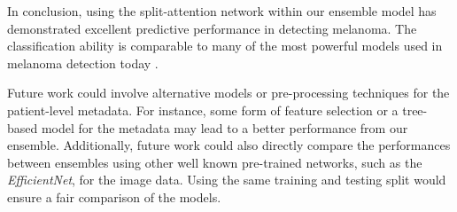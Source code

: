 \documentclass [MAS] {uclathes}
\begin{document}
In conclusion, using the split-attention network within our ensemble model has demonstrated excellent predictive performance in detecting melanoma. The classification ability is comparable to many of the most powerful models used in melanoma detection today \cite{EffNet_MelDet}. 

Future work could involve alternative models or pre-processing techniques for the patient-level metadata. For instance, some form of feature selection or a tree-based model for the metadata may lead to a better performance from our ensemble. Additionally, future work could also directly compare the performances between ensembles using other well known pre-trained networks, such as the \textit{EfficientNet}, for the image data. Using the same training and testing split would ensure a fair comparison of the models.


\end{document}
